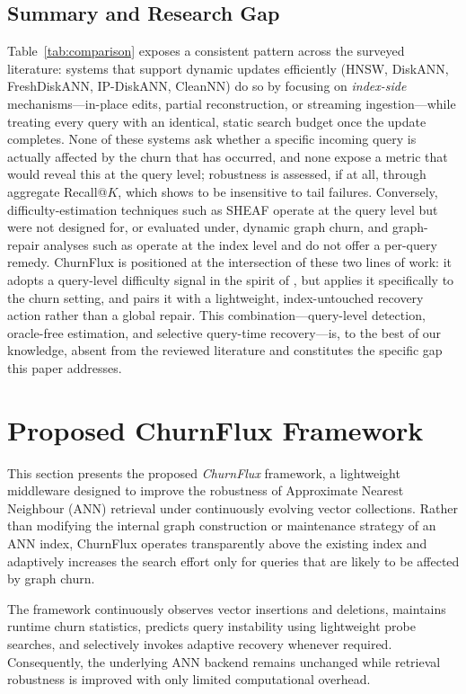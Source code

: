 \documentclass{ieeeaccess}
\begin{document}
\subsection{Summary and Research Gap}
Table~\ref{tab:comparison} exposes a consistent pattern across the surveyed literature: systems that support dynamic updates efficiently (HNSW, DiskANN, FreshDiskANN, IP-DiskANN, CleanNN) do so by focusing on \emph{index-side} mechanisms---in-place edits, partial reconstruction, or streaming ingestion---while treating every query with an identical, static search budget once the update completes. None of these systems ask whether a specific incoming query is actually affected by the churn that has occurred, and none expose a metric that would reveal this at the query level; robustness is assessed, if at all, through aggregate Recall@$K$, which \cite{Robust2025} shows to be insensitive to tail failures. Conversely, difficulty-estimation techniques such as SHEAF \cite{Sheaf2026} operate at the query level but were not designed for, or evaluated under, dynamic graph churn, and graph-repair analyses such as \cite{Mandarapu2026} operate at the index level and do not offer a per-query remedy. ChurnFlux is positioned at the intersection of these two lines of work: it adopts a query-level difficulty signal in the spirit of \cite{Sheaf2026}, but applies it specifically to the churn setting, and pairs it with a lightweight, index-untouched recovery action rather than a global repair. This combination---query-level detection, oracle-free estimation, and selective query-time recovery---is, to the best of our knowledge, absent from the reviewed literature and constitutes the specific gap this paper addresses.

\section{Proposed ChurnFlux Framework}
\label{sec:method}

This section presents the proposed \textit{ChurnFlux} framework, a lightweight
middleware designed to improve the robustness of Approximate Nearest Neighbour
(ANN) retrieval under continuously evolving vector collections. Rather than
modifying the internal graph construction or maintenance strategy of an ANN
index, ChurnFlux operates transparently above the existing index and
adaptively increases the search effort only for queries that are likely to be
affected by graph churn.

The framework continuously observes vector insertions and deletions,
maintains runtime churn statistics, predicts query instability using
lightweight probe searches, and selectively invokes adaptive recovery whenever
required. Consequently, the underlying ANN backend remains unchanged while
retrieval robustness is improved with only limited computational overhead.
\end{document}
